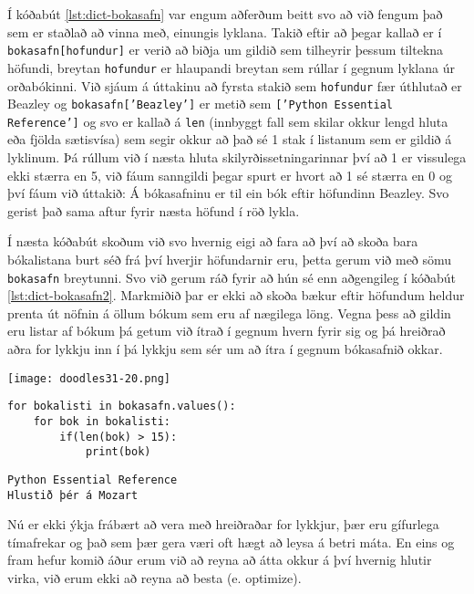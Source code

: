 Í kóðabút \ref{lst:dict-bokasafn} var engum aðferðum beitt svo að við fengum það sem er staðlað að vinna með, einungis lyklana.
Takið eftir að þegar kallað er í \texttt{bokasafn[hofundur]} er verið að biðja um gildið sem tilheyrir þessum tiltekna höfundi, breytan \texttt{hofundur} er hlaupandi breytan sem rúllar í gegnum lyklana úr orðabókinni.
Við sjáum á úttakinu að fyrsta stakið sem \texttt{hofundur} fær úthlutað er Beazley og \texttt{bokasafn['Beazley']} er metið sem \texttt{['Python Essential Reference']} og svo er kallað á \texttt{len} (innbyggt fall sem skilar okkur lengd hluta eða fjölda sætisvísa) sem segir okkur að það sé 1 stak í listanum sem er gildið á lyklinum.
Þá rúllum við í næsta hluta skilyrðissetningarinnar því að 1 er vissulega ekki stærra en 5, við fáum sanngildi þegar spurt er hvort að 1 sé stærra en 0 og því fáum við úttakið: Á bókasafninu er til ein bók eftir höfundinn Beazley.
Svo gerist það sama aftur fyrir næsta höfund í röð lykla.

Í næsta kóðabút skoðum við svo hvernig eigi að fara að því að skoða bara bókalistana burt séð frá því hverjir höfundarnir eru, þetta gerum við með sömu \texttt{bokasafn} breytunni.
Svo við gerum ráð fyrir að hún sé enn aðgengileg í kóðabút \ref{lst:dict-bokasafn2}.
Markmiðið þar er ekki að skoða bækur eftir höfundum heldur prenta út nöfnin á öllum bókum sem eru af nægilega löng.
Vegna þess að gildin eru listar af bókum þá getum við ítrað í gegnum hvern fyrir sig og þá hreiðrað aðra for lykkju inn í þá lykkju sem sér um að ítra í gegnum bókasafnið okkar.

	\begin{center}
		\texttt{[image: doodles31-20.png]}
	\end{center}
		
\begin{lstlisting}[caption=Ítrun í gegnum orðabækur með .values(), label=lst:dict-bokasafn2]
for bokalisti in bokasafn.values():
	for bok in bokalisti:
		if(len(bok) > 15):
			print(bok)
\end{lstlisting}
\lstset{style=uttak}
\begin{lstlisting}
Python Essential Reference
Hlustið þér á Mozart
\end{lstlisting}
\lstset{style=venjulegt}

Nú er ekki ýkja frábært að vera með hreiðraðar for lykkjur, þær eru gífurlega tímafrekar og það sem þær gera væri oft hægt að leysa á betri máta.
En eins og fram hefur komið áður erum við að reyna að átta okkur á því hvernig hlutir virka, við erum ekki að reyna að besta (e. optimize).


